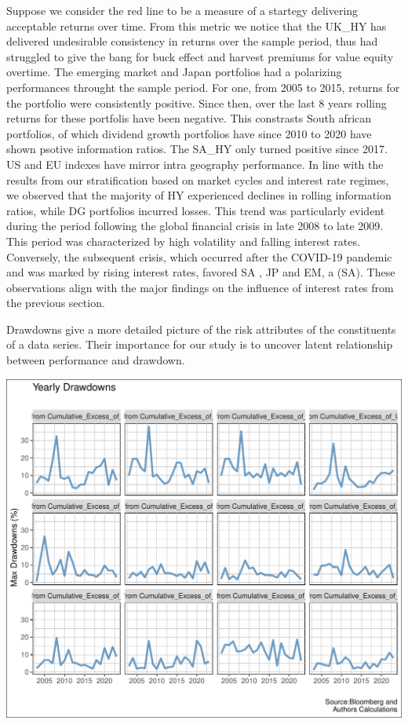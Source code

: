 \documentclass[12pt,preprint, authoryear]{elsarticle}
\let\origfigure\figure
\let\endorigfigure\endfigure
\renewenvironment{figure}[1][2] {
    \expandafter\origfigure\expandafter[H]
} {
    \endorigfigure
}
\numberwithin{equation}{section}
\numberwithin{figure}{section}
\numberwithin{table}{section}
\begin{document}
Suppose we consider the red line to be a measure of a startegy
delivering acceptable returns over time. From this metric we notice that
the UK\_HY has delivered undesirable consistency in returns over the
sample period, thus had struggled to give the bang for buck effect and
harvest premiums for value equity overtime. The emerging market and
Japan portfolios had a polarizing performances throught the sample
period. For one, from 2005 to 2015, returns for the portfolio were
consistently positive. Since then, over the last 8 years rolling returns
for these portfolis have been negative. This constrasts South african
portfolios, of which dividend growth portfolios have since 2010 to 2020
have shown psotive information ratios. The SA\_HY only turned positive
since 2017. US and EU indexes have mirror intra geography performance.
In line with the results from our stratification based on market cycles
and interest rate regimes, we observed that the majority of HY
experienced declines in rolling information ratios, while DG portfolios
incurred losses. This trend was particularly evident during the period
following the global financial crisis in late 2008 to late 2009. This
period was characterized by high volatility and falling interest rates.
Conversely, the subsequent crisis, which occurred after the COVID-19
pandemic and was marked by rising interest rates, favored SA , JP and
EM, a (SA). These observations align with the major findings on the
influence of interest rates from the previous section.

Drawdowns give a more detailed picture of the risk attributes of the
constituents of a data series. Their importance for our study is to
uncover latent relationship between performance and drawdown.

\begin{figure}[H]

\includegraphics{Much_Ado_About_Dividends_files/figure-latex/Figure2-1} \hfill{}

\caption{Rolling 3 Year Returns \label{fig2}}\label{fig:Figure2}
\end{figure}
\end{document}
